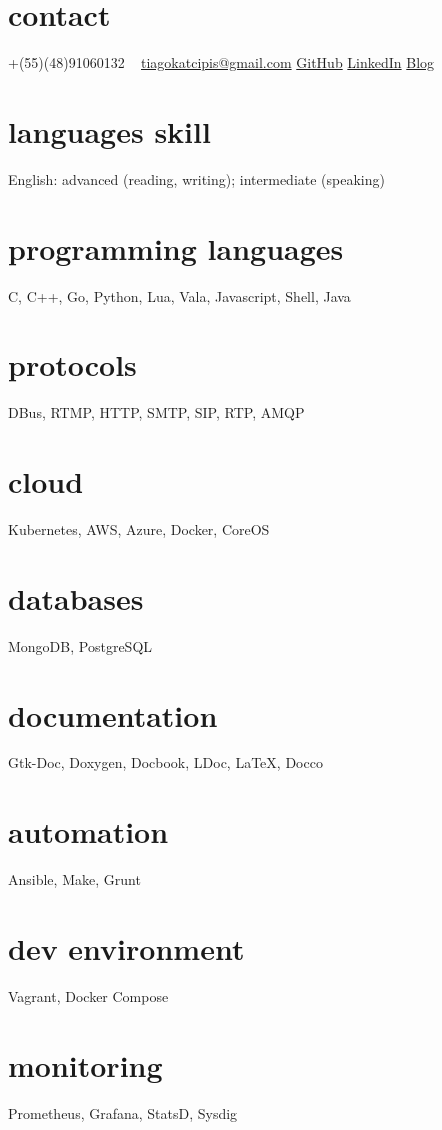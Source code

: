 \documentclass[]{friggeri-cv} %
\begin{document}


\begin{aside} %
\section{contact}
+(55)(48)91060132
~
\href{mailto:tiagokatcipis@gmail.com}{tiagokatcipis@gmail.com}
\href{https://github.com/katcipis}{GitHub}
\href{http://www.linkedin.com/pub/tiago-katcipis/1b/273/8b0}{LinkedIn}
\href{http://katcipis.github.io/}{Blog}
\section{languages skill}
English: advanced (reading, writing); intermediate (speaking)
\section{programming languages}
C, C++, Go, Python, Lua, Vala, Javascript, Shell, Java
\section{protocols}
DBus, RTMP, HTTP, SMTP, SIP, RTP, AMQP
\section{cloud}
Kubernetes, AWS, Azure, Docker, CoreOS
\section{databases}
MongoDB, PostgreSQL
\section{documentation}
Gtk-Doc, Doxygen, Docbook, LDoc, LaTeX, Docco
\section{automation}
Ansible, Make, Grunt
\section{dev environment}
Vagrant, Docker Compose
\section{monitoring}
Prometheus, Grafana, StatsD, Sysdig
\end{aside}
\end{document}
